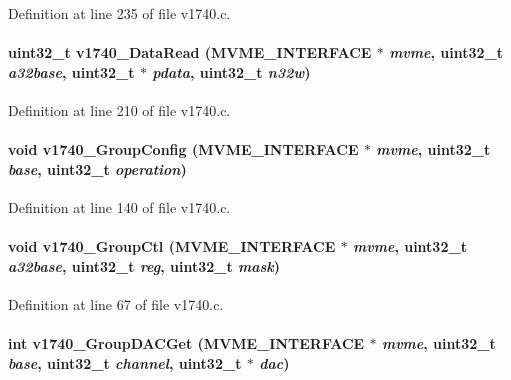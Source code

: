 Definition at line 235 of file v1740.c.
\paragraph[{v1740\_\-DataRead}]{\setlength{\rightskip}{0pt plus 5cm}uint32\_\-t v1740\_\-DataRead ({\bf MVME\_\-INTERFACE} $\ast$ {\em mvme}, \/  uint32\_\-t {\em a32base}, \/  uint32\_\-t $\ast$ {\em pdata}, \/  uint32\_\-t {\em n32w})}\hfill\label{v1740drv_8h_a8cd52c7b8687a75689b8896284bd5f85}


Definition at line 210 of file v1740.c.
\paragraph[{v1740\_\-GroupConfig}]{\setlength{\rightskip}{0pt plus 5cm}void v1740\_\-GroupConfig ({\bf MVME\_\-INTERFACE} $\ast$ {\em mvme}, \/  uint32\_\-t {\em base}, \/  uint32\_\-t {\em operation})}\hfill\label{v1740drv_8h_a4366f9498ad2c7a493ae8ef0ae47e79f}


Definition at line 140 of file v1740.c.
\paragraph[{v1740\_\-GroupCtl}]{\setlength{\rightskip}{0pt plus 5cm}void v1740\_\-GroupCtl ({\bf MVME\_\-INTERFACE} $\ast$ {\em mvme}, \/  uint32\_\-t {\em a32base}, \/  uint32\_\-t {\em reg}, \/  uint32\_\-t {\em mask})}\hfill\label{v1740drv_8h_a91587cd957c8fb678a94921b3e03a5ef}


Definition at line 67 of file v1740.c.
\paragraph[{v1740\_\-GroupDACGet}]{\setlength{\rightskip}{0pt plus 5cm}int v1740\_\-GroupDACGet ({\bf MVME\_\-INTERFACE} $\ast$ {\em mvme}, \/  uint32\_\-t {\em base}, \/  uint32\_\-t {\em channel}, \/  uint32\_\-t $\ast$ {\em dac})}\hfill\label{v1740drv_8h_aedb4a49b616447e088e37a8c551b02d4}
